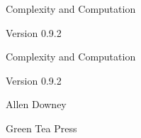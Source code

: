\documentclass[10pt]{book}
\newcommand{\thetitle}{Complexity and Computation}
\newcommand{\theversion}{0.9.2}
\begin{document}
\frontmatter




\newtheorem{ex}{Exercise}[chapter]

\begin{latexonly}

\renewcommand{\blankpage}{\thispagestyle{empty} \quad \newpage}



\thispagestyle{empty}

\begin{flushright}
\vspace*{2.0in}

\begin{spacing}{3}
{\huge \thetitle}
\end{spacing}

\vspace{0.25in}

Version \theversion

\vfill

\end{flushright}


\blankpage
\blankpage

\pagebreak
\thispagestyle{empty}

\begin{flushright}
\vspace*{2.0in}

\begin{spacing}{3}
{\huge \thetitle}
\end{spacing}

\vspace{0.25in}

Version \theversion

\vspace{1in}


{\Large
Allen Downey\\
}


\vspace{0.5in}

{\Large Green Tea Press}


\end{flushright}
\end{latexonly}
\end{document}
